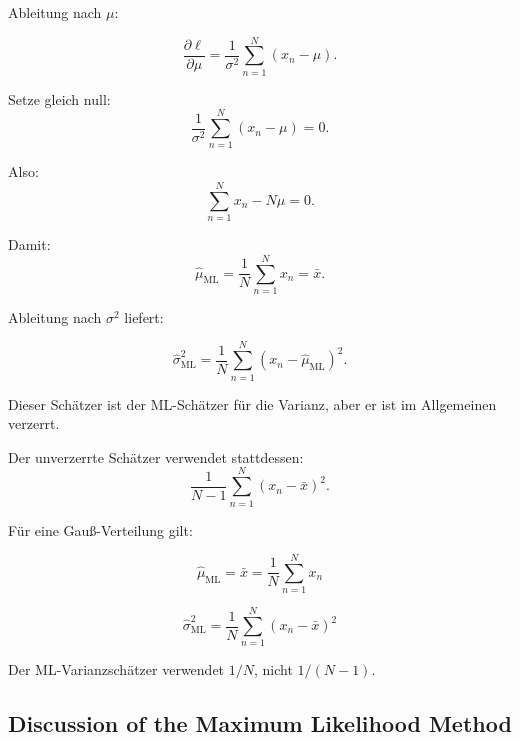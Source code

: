 \documentclass[11pt,a4paper]{scrartcl}
\begin{document}
\begin{calculationbox}
    Ableitung nach \(\mu\):

    \[
        \frac{\partial \ell}{\partial \mu}
        =
        \frac{1}{\sigma^2}
        \sum_{n=1}^{N}
        (x_n-\mu).
    \]

    Setze gleich null:
    \[
        \frac{1}{\sigma^2}
        \sum_{n=1}^{N}
        (x_n-\mu)
        =
        0.
    \]

    Also:
    \[
        \sum_{n=1}^{N}x_n
        -
        N\mu
        =
        0.
    \]

    Damit:
    \[
        \hat\mu_{\mathrm{ML}}
        =
        \frac{1}{N}
        \sum_{n=1}^{N}
        x_n
        =
        \bar x.
    \]
\end{calculationbox}

\begin{calculationbox}
    Ableitung nach \(\sigma^2\) liefert:

    \[
        \hat\sigma^2_{\mathrm{ML}}
        =
        \frac{1}{N}
        \sum_{n=1}^{N}
        (x_n-\hat\mu_{\mathrm{ML}})^2.
    \]

    Dieser Schätzer ist der ML-Schätzer für die Varianz, aber er ist im
    Allgemeinen verzerrt.

    Der unverzerrte Schätzer verwendet stattdessen:
    \[
        \frac{1}{N-1}
        \sum_{n=1}^{N}
        (x_n-\bar x)^2.
    \]
\end{calculationbox}

\begin{answerbox}
    Für eine Gauß-Verteilung gilt:

    \[
        \boxed{
            \hat\mu_{\mathrm{ML}}
            =
            \bar x
            =
            \frac{1}{N}
            \sum_{n=1}^{N}
            x_n
        }
    \]

    \[
        \boxed{
            \hat\sigma^2_{\mathrm{ML}}
            =
            \frac{1}{N}
            \sum_{n=1}^{N}
            (x_n-\bar x)^2
        }
    \]

    Der ML-Varianzschätzer verwendet \(1/N\), nicht \(1/(N-1)\).
\end{answerbox}

\subsection{Discussion of the Maximum Likelihood Method}
\end{document}
